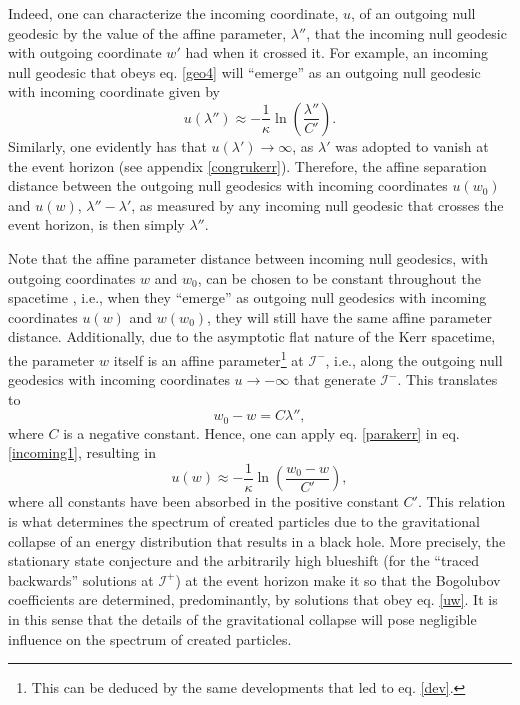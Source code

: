 \documentclass[
12pt,		%
openright,	%
twoside,  %
a4paper,			%
chapter=TITLE,		%
english,			%
french,				%
spanish,			%
brazil				%
]{USPSC-classe/USPSC}
\begin{document}
Indeed, one can characterize the incoming coordinate, $u$, of an outgoing null geodesic by the value of the affine parameter, $\lambda''$, that the incoming null geodesic with outgoing coordinate $w'$ had when it crossed it. For example, an incoming null geodesic that obeys eq. \ref{geo4} will ``emerge'' as an outgoing null geodesic with incoming coordinate given by
\begin{equation}\label{incoming1}
    u(\lambda'')\approx-\frac{1}{\kappa}\ln\left(\frac{\lambda''}{C'}\right).
\end{equation}
Similarly, one evidently has that $u(\lambda')\to\infty$, as $\lambda'$ was adopted to vanish at the event horizon (see appendix \ref{congrukerr}). Therefore, the affine separation distance between the outgoing null geodesics with incoming coordinates $u(w_0)$ and $u(w)$, $\lambda''-\lambda'$, as measured by any incoming null geodesic that crosses the event horizon, is then simply $\lambda''$.

Note that the affine parameter distance between incoming null geodesics, with outgoing coordinates $w$ and $w_0$, can be chosen to be constant throughout the spacetime \cite{Parker2009}, i.e., when they ``emerge'' as outgoing null geodesics with incoming coordinates $u(w)$ and $w(w_0)$, they will still have the same affine parameter distance. Additionally, due to the asymptotic flat nature of the Kerr spacetime, the parameter $w$ itself is an affine parameter\footnote{This can be deduced by the same developments that led to eq. \ref{dev}.} at $\mathscr{I}^-$, i.e., along the outgoing null geodesics with incoming coordinates $u\to-\infty$ that generate $\mathscr{I}^-$. This translates to
\begin{equation}\label{parakerr}
    w_0-w=C\lambda'',
\end{equation}
where $C$ is a negative constant. Hence, one can apply eq. \ref{parakerr} in eq. \ref{incoming1}, resulting in
\begin{equation}\label{uw}
    u(w)\approx-\frac{1}{\kappa}\ln\left(\frac{w_0-w}{C'}\right),
\end{equation}
where all constants have been absorbed in the positive constant $C'$. This relation is what determines the spectrum of created particles due to the gravitational collapse of an energy distribution that results in a black hole. More precisely, the stationary state conjecture and the arbitrarily high blueshift (for the ``traced backwards'' solutions at $\mathscr{I}^+$) at the event horizon make it so that the Bogolubov coefficients are determined, predominantly, by solutions that obey eq. \ref{uw}. It is in this sense that the details of the gravitational collapse will pose negligible influence on the spectrum of created particles.
\end{document}
